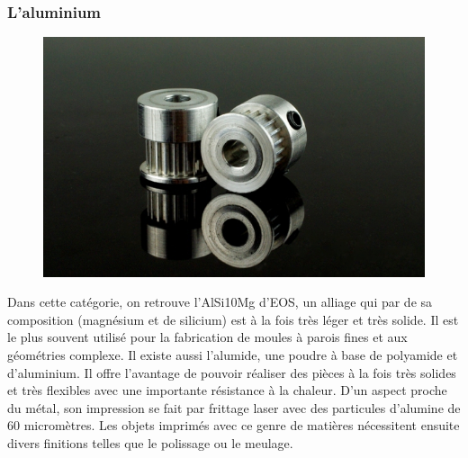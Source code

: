 \documentclass{article}
\begin{document}
\subsubsection{L'aluminium}
\begin{figure}[h!]
\centering
\includegraphics[scale=0.3]{./images/aluminium.png}
\end{figure}\hfill
 \par\leavevmode\par
Dans cette catégorie, on retrouve l'AlSi10Mg d'EOS, un alliage qui par de sa composition (magnésium et de silicium) est à la fois très léger et très solide. Il est le plus souvent utilisé pour la fabrication de moules à parois fines et aux géométries complexe. Il existe aussi l'alumide, une poudre à base de polyamide et d'aluminium. Il offre l'avantage de pouvoir réaliser des pièces à la fois très solides et très flexibles avec une importante résistance à la chaleur. D'un aspect proche du métal, son impression se fait par frittage laser avec des particules d'alumine de 60 micromètres. Les objets imprimés avec ce genre de matières nécessitent ensuite divers finitions telles que le polissage ou le meulage.\hfill
 \par\leavevmode\par
{}
\end{document}
